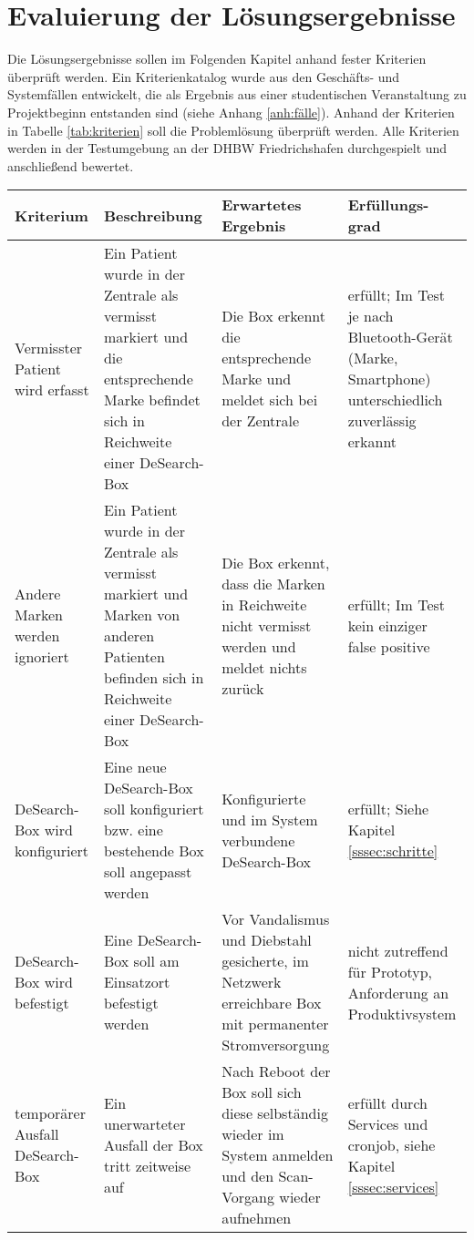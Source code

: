 \section{Evaluierung der Lösungsergebnisse}
Die Lösungsergebnisse sollen im Folgenden Kapitel anhand fester Kriterien überprüft werden. Ein Kriterienkatalog wurde aus den Geschäfts- und Systemfällen entwickelt, die als Ergebnis aus einer studentischen Veranstaltung zu Projektbeginn entstanden sind (siehe Anhang \ref{anh:fälle}).
Anhand der Kriterien in Tabelle \ref{tab:kriterien} soll die Problemlösung überprüft werden. Alle Kriterien werden in der Testumgebung an der DHBW Friedrichshafen durchgespielt und anschließend bewertet.
\begin{center}
	\begin{longtable}{ | p{} | p{5cm} | p{5cm} | p{} |}
	 \hline
	 \textbf{Kriterium} & \textbf{Beschreibung} & \textbf{Erwartetes Ergebnis} & \textbf{Erfüllungs-grad} \\ \hline
	 Vermisster Patient wird erfasst & Ein Patient wurde in der Zentrale als vermisst markiert und die entsprechende Marke befindet sich in Reichweite einer DeSearch-Box & Die Box erkennt die entsprechende Marke und meldet sich bei der Zentrale & erfüllt; Im Test je nach Bluetooth-Gerät (Marke, Smartphone) unterschiedlich zuverlässig erkannt \\ \hline
	 Andere Marken werden ignoriert & Ein Patient wurde in der Zentrale als vermisst markiert und Marken von anderen Patienten befinden sich in Reichweite einer DeSearch-Box & Die Box erkennt, dass die Marken in Reichweite nicht vermisst werden und meldet nichts zurück & erfüllt; Im Test kein einziger false positive \\ 
	 \hline
	 DeSearch-Box wird konfiguriert & Eine neue DeSearch-Box soll konfiguriert bzw. eine bestehende Box soll angepasst werden & Konfigurierte und im System verbundene DeSearch-Box & erfüllt; Siehe Kapitel \ref{sssec:schritte} \\ 
	 \hline
	 DeSearch-Box wird befestigt & Eine DeSearch-Box soll am Einsatzort befestigt werden & Vor Vandalismus und Diebstahl gesicherte, im Netzwerk erreichbare Box mit permanenter Stromversorgung & nicht zutreffend für Prototyp, Anforderung an Produktivsystem \\ 
	 \hline
	 temporärer Ausfall DeSearch-Box & Ein unerwarteter Ausfall der Box tritt zeitweise auf & Nach Reboot der Box soll sich diese selbständig wieder im System anmelden und den Scan-Vorgang wieder aufnehmen & erfüllt durch Services und cronjob, siehe Kapitel \ref{sssec:services}\\ 

\end{longtable}
\end{center}
